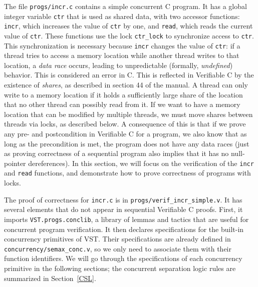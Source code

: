 \documentclass[11pt]{article} %
\begin{document}
The file \texttt{progs/incr.c} contains a simple concurrent C program. It has a global integer variable \texttt{ctr} that is used as shared data, with two accessor functions: \texttt{incr}, which increases the value of \texttt{ctr} by one, and \texttt{read}, which reads the current value of \texttt{ctr}. These functions use the lock \texttt{ctr\_lock} to synchronize access to \texttt{ctr}. This synchronization is necessary because \texttt{incr} changes the value of \texttt{ctr}: if a thread tries to access a memory location while another thread writes to that location, a \emph{data race} occurs, leading to unpredictable (formally, \emph{undefined}) behavior. This is considered an error in C. This is reflected in Verifiable C by the existence of \emph{shares}, as described in section 44 of the manual. A thread can only write to a memory location if it holds a sufficiently large share of the location that no other thread can possibly read from it. If we want to have a memory location that can be modified by multiple threads, we must move shares between threads via locks, as described below. A consequence of this is that if we prove any pre- and postcondition in Verifiable C for a program, we also know that as long as the precondition is met, the program does not have any data races (just as proving correctness of a sequential program also implies that it has no null-pointer dereferences). In this section, we will focus on the verification of the \texttt{incr} and \texttt{read} functions, and demonstrate how to prove correctness of programs with locks.

The proof of correctness for \texttt{incr.c} is in \texttt{progs/verif\_incr\_simple.v}. It has several elements that do not appear in sequential Verifiable C proofs. First, it imports \texttt{VST.progs.conclib}, a library of lemmas and tactics that are useful for concurrent program verification. It then declares specifications for the built-in concurrency primitives of VST. Their specifications are already defined in \texttt{concurrency/semax\_conc.v}, so we only need to associate them with their function identifiers. We will go through the specifications of each concurrency primitive in the following sections; the concurrent separation logic rules are summarized in Section~\ref{CSL}.
\end{document}
